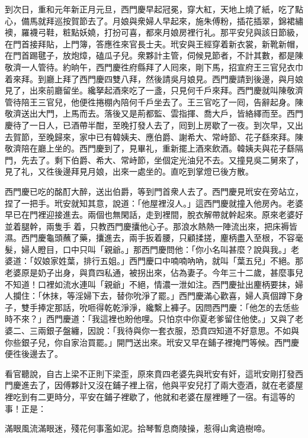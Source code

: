 到次日，重和元年新正月元旦，西門慶早起冠冕，穿大紅，天地上燒了紙，吃了點心，備馬就拜巡按賀節去了。月娘與衆婦人早起來，施朱傅粉，插花插翠，錦裙繡襖，羅襪弓鞋，粧點妖嬈，打扮可喜，都來月娘房裡行礼。那平安兒與該日節級，在門首接拜貼，上門簿，答應徃來官長士夫。玳安與王經穿着新衣裳，新靴新帽，在門首踢毽子，放炮𤍤，磕瓜子兒。衆夥計主管，伺候見節者，不計其數，都是陳敬濟一人管待。{}約晌午，西門慶徃府縣拜了人囘來，剛下馬，招宣府王三官兒衣巾着來拜。到廳上拜了西門慶四雙八拜，然後請吳月娘見。西門慶請到後邊，與月娘見了，出來前廳留坐。纔拏起酒來吃了一盞，只見何千戶來拜。西門慶就叫陳敬濟管待陪王三官兒，他便徃捲棚內陪何千戶坐去了。王三官吃了一囘，告辭起身。陳敬濟送出大門，上馬而去。落後又是荊都監、雲指揮、喬大戶，皆絡繹而至。西門慶待了一日人，已酒帶半酣，至晚打發人去了，囘到上房歇了一夜。到次早，又出去賀節，至晚歸來，家中已有韓姨夫、應伯爵、謝希大、常峙節、花子繇來拜。陳敬濟陪在廳上坐的。西門慶到了，見畢礼，重新擺上酒來飲酒。韓姨夫與花子繇隔門，先去了。剩下伯爵、希大、常峙節，坐個定光油兒不去。{}又撞見吳二舅來了，見了礼，又徃後邊拜見月娘，出來一處坐的。直吃到掌燈已後方散。

西門慶已吃的酩酊大醉，送出伯爵，等到門首衆人去了。西門慶見玳安在旁站立，捏了一把手。玳安就知其意，說道：「他屋裡沒人。」這西門慶就撞入他房內。老婆早已在門裡迎接進去。{}兩個也無閑話，走到裡間，脫衣解帶就幹起來。原來老婆好並着腿幹，兩隻手𢵞着，只教西門慶攮他心子。那浪水熱熱一陣流出來，把床褥皆濕。西門慶龜頭蘸了藥，攮進去，兩手扳着腰，只顧揉搓，麈柄盡入至根，不容毫髮，婦人瞪目，口中只叫「親爺。」那西門慶問他：「你小名叫甚麼？說與我。」老婆道：「奴娘家姓葉，排行五姐。」西門慶口中喃喃吶吶，就叫「葉五兒」不絕。那老婆原是奶子出身，與賁四私通，被拐出來，佔為妻子。今年三十二歲，甚麼事兒不知道！口裡如流水連叫「親爺」不絕，情濃一泄如注。西門慶扯出麈柄要抹，婦人攔住：「休抹，等淫婦下去，替你吮淨了罷。」西門慶滿心歡喜，婦人真個蹲下身子，雙手捧定那話，吮咂得乾乾淨淨，纔繫上褲子。因問西門慶：「他怎的去恁些時不來？」西門慶道：「我這裡也盼他哩。只怕京中你夏老爹留住他使。」又與了老婆二、三兩銀子盤纏，因說：「我待與你一套衣服，恐賁四知道不好意思。不如與你些銀子兒，你自家治買罷。」開門送出來。玳安又早在鋪子裡掩門等候。西門慶便徃後邊去了。

看官聽說，自古上梁不正則下梁歪，原來賁四老婆先與玳安有奸，這玳安剛打發西門慶進去了，因傅夥計又沒在鋪子裡上宿，他與平安兒打了兩大壺酒，就在老婆屋裡吃到有二更時分，平安在鋪子裡歇了，他就和老婆在屋裡睡了一宿。有這等的事！正是：

滿眼風流滿眼迷，殘花何事濫如泥。拾琴暫息商陵操，惹得山禽遶樹啼。


